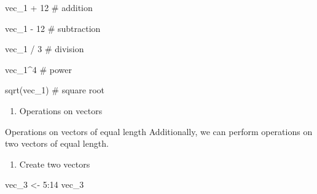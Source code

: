\documentclass[
  letterpaper,
  DIV=11,
  numbers=noendperiod]{scrreprt}
\newenvironment{Shaded}{}{}
\newcommand{\CommentTok}[1]{\textcolor[rgb]{0.42,0.45,0.49}{#1}}
\newcommand{\DecValTok}[1]{\textcolor[rgb]{0.00,0.36,0.77}{#1}}
\newcommand{\FunctionTok}[1]{\textcolor[rgb]{0.44,0.26,0.76}{#1}}
\newcommand{\NormalTok}[1]{\textcolor[rgb]{0.14,0.16,0.18}{#1}}
\newcommand{\OtherTok}[1]{\textcolor[rgb]{0.44,0.26,0.76}{#1}}
\newcommand{\SpecialCharTok}[1]{\textcolor[rgb]{0.00,0.36,0.77}{#1}}
\providecommand{\tightlist}{%
  \setlength{\itemsep}{0pt}\setlength{\parskip}{0pt}}\usepackage{longtable,booktabs,array}
\begin{document}
\begin{Shaded}
\begin{Highlighting}[]
\NormalTok{vec\_1 }\SpecialCharTok{+} \DecValTok{12} \CommentTok{\# addition}
\end{Highlighting}
\end{Shaded}

\begin{Shaded}
\begin{Highlighting}[]
\NormalTok{vec\_1 }\SpecialCharTok{{-}} \DecValTok{12} \CommentTok{\# subtraction}
\end{Highlighting}
\end{Shaded}

\begin{Shaded}
\begin{Highlighting}[]
\NormalTok{vec\_1 }\SpecialCharTok{/} \DecValTok{3} \CommentTok{\# division}
\end{Highlighting}
\end{Shaded}

\begin{Shaded}
\begin{Highlighting}[]
\NormalTok{vec\_1}\SpecialCharTok{\^{}}\DecValTok{4} \CommentTok{\# power}
\end{Highlighting}
\end{Shaded}

\begin{Shaded}
\begin{Highlighting}[]
\FunctionTok{sqrt}\NormalTok{(vec\_1) }\CommentTok{\# square root}
\end{Highlighting}
\end{Shaded}

\begin{enumerate}
\def\labelenumi{\arabic{enumi}.}
\setcounter{enumi}{1}
\tightlist
\item
  Operations on vectors
\end{enumerate}

Operations on vectors of equal length Additionally, we can perform
operations on two vectors of equal length.

\begin{enumerate}
\def\labelenumi{\alph{enumi}.}
\tightlist
\item
  Create two vectors
\end{enumerate}

\begin{Shaded}
\begin{Highlighting}[]
\NormalTok{vec\_3 }\OtherTok{\textless{}{-}} \DecValTok{5}\SpecialCharTok{:}\DecValTok{14}
\NormalTok{vec\_3}
\end{Highlighting}
\end{Shaded}
\end{document}

